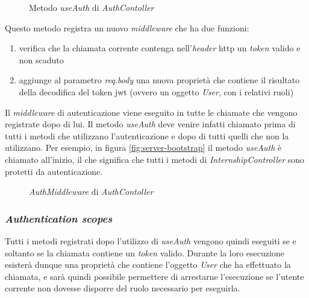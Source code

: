 \begin{figure}[H] 
	\centering    
	
	\caption[Metodo \textit{useAuth} di \textit{AuthContoller}]{Metodo \textit{useAuth} di \textit{AuthContoller}}
	\label{fig:server-base-controller}
\end{figure}

\noindent
Questo metodo registra un nuovo \textit{middleware} che ha due funzioni:
\begin{enumerate}
	\item verifica che la chiamata corrente contenga nell'\textit{header} \acrshort{http} un \textit{token} valido e non scaduto
	\item aggiunge al parametro \textit{req.body} una nuova proprietà che contiene il risultato della decodifica del token \acrshort{jwt} (ovvero un oggetto \textit{User}, con i relativi ruoli)
\end{enumerate}
Il \textit{middleware} di autenticazione viene eseguito in tutte le chiamate che vengono registrate dopo di lui. Il metodo \textit{useAuth} deve venire infatti chiamato prima di tutti i metodi che utilizzano l'autenticazione e dopo di tutti quelli che non la utilizzano. Per esempio, in figura \ref{fig:server-bootstrap} il metodo \textit{useAuth} è chiamato all'inizio, il che significa che tutti i metodi di \textit{InternshipController} sono protetti da autenticazione.

\begin{figure}[H] 
	\centering    
	
	\caption[\textit{AuthMiddleware} di \textit{AuthContoller}]{\textit{AuthMiddleware} di \textit{AuthContoller}}
	\label{fig:server-auth-middleware}
\end{figure}

\subsubsection{\textit{Authentication scopes}}
\label{server:scopes}
Tutti i metodi registrati dopo l'utilizzo di \textit{useAuth} vengono quindi eseguiti se e soltanto se la chiamata contiene un \textit{token} valido. Durante la loro esecuzione esisterà dunque una proprietà che contiene l'oggetto \textit{User} che ha effettuato la chiamata, e sarà quindi possibile permettere di arrestarne l'esecuzione se l'utente corrente non dovesse disporre del ruolo necessario per eseguirla.

